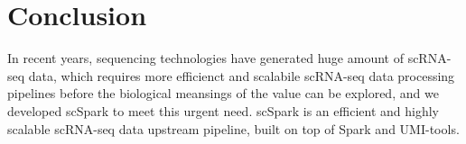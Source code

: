 \documentclass[conference]{IEEEtran}
\begin{document}

\section{Conclusion}

In recent years, sequencing technologies have generated huge amount of scRNA-seq data, which requires more efficienct and scalabile scRNA-seq data processing pipelines before the biological meansings of the value can be explored, and we developed scSpark to meet this urgent need. 
scSpark is an efficient and highly scalable scRNA-seq data upstream pipeline, built on top of Spark and UMI-tools.




\end{document}
